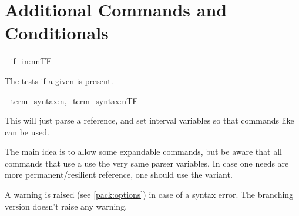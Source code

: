 \documentclass[10pt]{article}
\begin{document}
\section{Additional Commands and Conditionals}\label{conditionals:terms}

\begin{codedescribe}{\starray_if_in:nnTF}
\begin{codesyntax}%
\end{codesyntax}
The  tests if a given  is present.
\end{codedescribe}

\begin{codedescribe}[code,new=2023/05/20]{\starray_term_syntax:n,\starray_term_syntax:nTF}
\begin{codesyntax}%
\end{codesyntax}
This will just parse  a  reference, and set interval variables so that commands like  can be used.
\end{codedescribe}
\begin{tsremark}
The main idea is to allow some expandable commands, but be aware that all \tsobj{\starray_} commands that use a  use the very same parser variables. In case one needs are more permanent/resilient  reference, one should use the  variant.
\end{tsremark}
\begin{tsremark}
A warning is raised (see \ref{pack:options}) in case of a  syntax error. The branching version doesn't raise any warning.
\end{tsremark}
\end{document}
